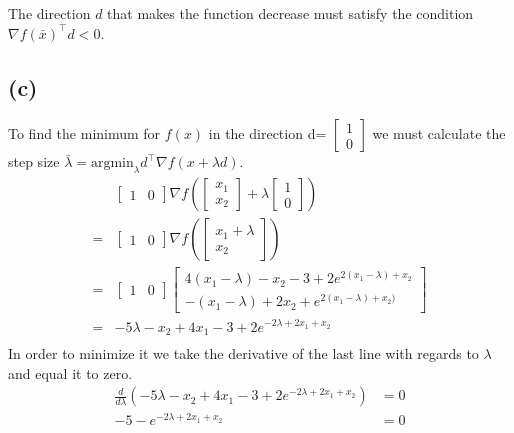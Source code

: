 \documentclass{article}
\begin{document}
	The direction $d$ that makes the function decrease must satisfy the condition $\nabla f(\bar{x})^\top d <0$.
\subsection*{(c)}
	To find the minimum for $f(x)$ in the direction d= $\begin{bmatrix}1 \\ 0\end{bmatrix}$ we must calculate the step size $\bar{\lambda}=\text{argmin}_{\lambda} d^\top \nabla f(x+ \lambda d)$. 
	\begin{align}
		&\begin{bmatrix}
			1 & 0
		\end{bmatrix}
		\nabla f
		\left(\begin{bmatrix}
			x_1 \\
			x_2
		\end{bmatrix}+
		\lambda
		\begin{bmatrix}
			1 \\
			 0
		 \end{bmatrix}\right) \\
	=&
	 \begin{bmatrix}
	 	1 & 0
	 \end{bmatrix}
	 \nabla f\left(
	 \begin{bmatrix}
	 	x_1+\lambda \\
	 	x_2
	 \end{bmatrix}\right) \\
 	=&
	 \begin{bmatrix}
 		1 & 0
 	\end{bmatrix}
	\begin{bmatrix}
 		4(x_1-\lambda)-x_2 -3+ 2 e^{2 (x_1-\lambda) + x_2 } \\
 		-(x_1-\lambda)+2x_2 + e^{2(x_1-\lambda)+x_2)}
 	\end{bmatrix} \\
 	 =&
 		-5\lambda-x_2 + 4x_1-3+ 2 e^{-2\lambda + 2 x_1 + x_2 } \\
	\end{align}
	In order to minimize it we take the derivative of the last line with regards to $\lambda$ and equal it to zero.
	\begin{align}
		 \frac{d}{d\lambda}\left(-5\lambda-x_2 + 4x_1-3+ 2 e^{-2\lambda + 2 x_1 + x_2 }\right) & = 0\\
		 -5-e^{-2\lambda + 2 x_1 + x_2 } & = 0\\
	\end{align}
\end{document}
